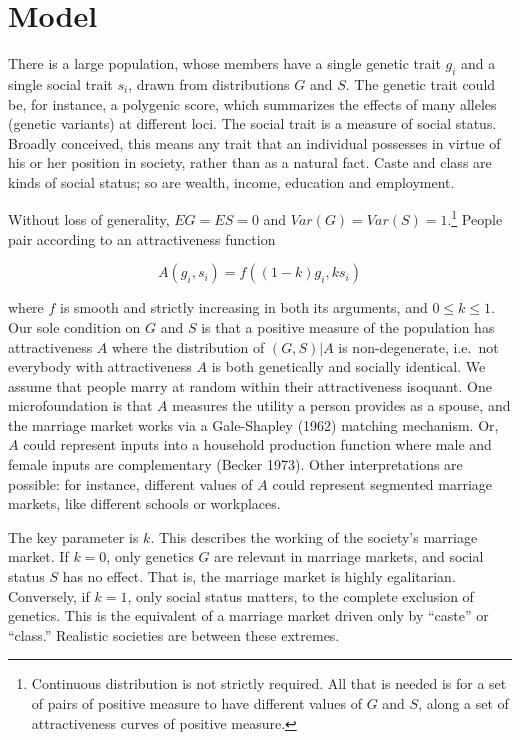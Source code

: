 \documentclass[
]{article}
\begin{document}
\hypertarget{model}{%
\section{Model}\label{model}}

There is a large population, whose members have a single genetic trait
\(g_{i}\) and a single social trait \(s_{i}\), drawn from distributions \(G\)
and \(S\). The genetic trait could be, for instance, a polygenic score,
which summarizes the effects of many alleles (genetic variants) at
different loci. The social trait is a measure of social status. Broadly
conceived, this means any trait that an individual possesses in virtue
of his or her position in society, rather than as a natural fact. Caste
and class are kinds of social status; so are wealth, income, education
and employment.

Without loss of generality, \(EG = ES = 0\) and \(Var(G) = Var(S) = 1\).\footnote{Continuous distribution is not strictly required. All that is
  needed is for a set of pairs of positive measure to have different
  values of \(G\) and \(S\), along a set of attractiveness curves of
  positive measure.}
People pair according to an attractiveness function

\[
A(g_{i},s_{i}) = f((1-k)g_{i},ks_{i})
\]

where \(f\) is smooth and strictly increasing in both its arguments, and
\(0 \le k \le 1\). Our sole condition on \(G\) and \(S\) is that a positive
measure of the population has attractiveness \(A\) where the distribution
of \((G, S)|A\) is non-degenerate, i.e.~not everybody with attractiveness
\(A\) is both genetically and socially identical. We assume that people
marry at random within their attractiveness isoquant. One
microfoundation is that \(A\) measures the utility a person provides as a
spouse, and the marriage market works via a Gale-Shapley
(1962) matching mechanism. Or, \(A\) could represent inputs
into a household production function where male and female inputs are
complementary (Becker 1973). Other interpretations are possible:
for instance, different values of \(A\) could represent segmented marriage
markets, like different schools or workplaces.

The key parameter is \(k\). This describes the working of the society's
marriage market. If \(k = 0\), only genetics \(G\) are relevant in marriage
markets, and social status \(S\) has no effect. That is, the marriage
market is highly egalitarian. Conversely, if \(k = 1\), only social status
matters, to the complete exclusion of genetics. This is the equivalent
of a marriage market driven only by ``caste'' or ``class.'' Realistic
societies are between these extremes.
\end{document}

